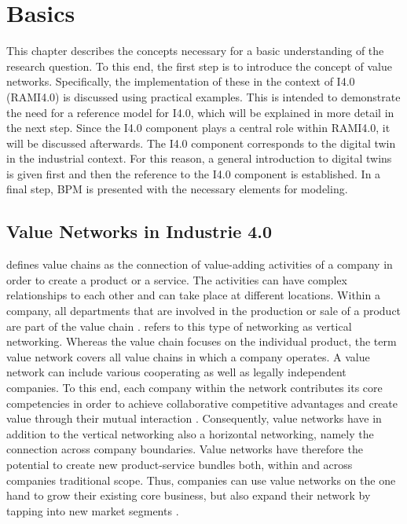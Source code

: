 \chapter{Basics}
This chapter describes the concepts necessary for a basic understanding of the research question. To this end, the first step is to introduce the concept of value networks. Specifically, the implementation of these in the context of \ac{I4.0} (\ac{RAMI4.0}) is discussed using practical examples. This is intended to demonstrate the need for a reference model for \ac{I4.0}, which will be explained in more detail in the next step. Since the \ac{I4.0} component plays a central role within \ac{RAMI4.0}, it will be discussed afterwards. The \ac{I4.0} component corresponds to the digital twin in the industrial context. For this reason, a general introduction to digital twins is given first and then the reference to the \ac{I4.0} component is established. In a final step, \ac{BPM} is presented with the necessary elements for modeling.

\section{Value Networks in Industrie 4.0} \label{sec:valuenetworks}
\citet[p. 6]{Sturgeon2001HowNetworks} defines value chains as the connection of value-adding activities of a company in order to create a product or a service. The activities can have complex relationships to each other and can take place at different locations. Within a company, all departments that are involved in the production or sale of a product are part of the value chain \cite[p. 10]{Sturgeon2001HowNetworks}. \citeauthor{Sturgeon2001HowNetworks} refers to this type of networking as vertical networking. Whereas the value chain focuses on the individual product, the term value network covers all value chains in which a company operates. A value network can include various cooperating as well as legally independent companies. To this end, each company within the network contributes its core competencies in order to achieve collaborative competitive advantages and create value through their mutual interaction \cite[p. 3]{Bach2010GeschaftsmodelleGrundlagen}. Consequently, value networks have in addition to the vertical networking also a horizontal networking, namely the connection across company boundaries. Value networks have therefore the potential to create new product-service bundles both, within and across companies traditional scope. Thus, companies can use value networks on the one hand to grow their existing core business, but also expand their network by tapping into new market segments \cite[p. 22]{Acatech2013Recommendations4.0}.

